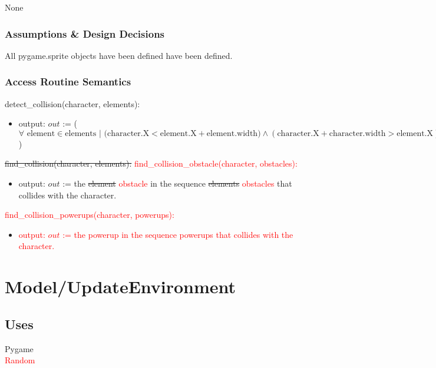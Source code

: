 \documentclass[12pt]{article}
\begin{document}
None

\subsubsection* {Assumptions \& Design Decisions}

All pygame.sprite objects have been defined have been defined.

\subsubsection* {Access Routine Semantics}

detect\_collision(character, elements):
\begin{itemize}
    \item output: $out$ := ($\forall \text{ element} \in \text{elements } | \text{ (character.X}< \text{element.X} + \text{element.width}) \land (\text{character.X} + \text{character.width} > \text{element.X}) \land (\text{character.Y} < \text{element.Y} + \text{element.height}) \land (\text{character.Y} + \text{Character.height} > \text{element.Y})$)
\end{itemize}

\noindent \sout{find\_collision(character, elements):} \textcolor{red}{find\_collision\_obstacle(character, obstacles):}
\begin{itemize}
    \item output: $out$ := the \sout{element} \textcolor{red}{obstacle} in the sequence \sout{elements} \textcolor{red}{obstacles} that collides with the character.
\end{itemize}


\noindent  \textcolor{red}{find\_collision\_powerups(character, powerups):}
\begin{itemize}
    \item \textcolor{red}{output: $out$ := the powerup in the sequence powerups that collides with the character.}
\end{itemize}

\newpage
\section*{Model/UpdateEnvironment}

\subsection* {Uses}
Pygame \\
\textcolor{red}{Random}
\end{document}
